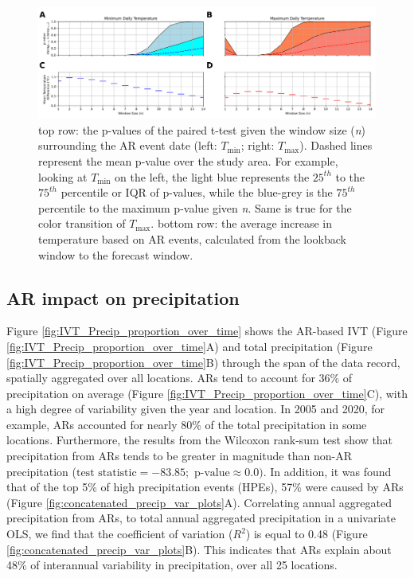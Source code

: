 \documentclass[12pts,draft]{AR_analysis_}
\begin{document}
\begin{figure}
\centering
\includegraphics[width=1.0\textwidth]{./images/tmin_vs_tmax_subplots.png}
\caption{top row: the p-values of the paired t-test given the
	window size (\emph{n}) surrounding the AR event date (left:
	$T_{\text{min}}$; right: $T_{\text{max}}$). Dashed lines
	represent the mean p-value over the study area. For example, looking 
	at $T_{\text{min}}$ on the left, the light blue represents the $25^{th}$ to the 
	$75^{th}$ percentile or IQR of p-values, while the blue-grey is the $75^{th}$ 
	percentile to the maximum p-value given \emph{n}. Same is true for the 
	color transition of $T_{\text{max}}$. bottom row: the average increase
	in temperature based on AR events, calculated from the lookback 
	window to the forecast window.}
\label{fig:tmin_vs_tmax_subplots} 
\end{figure}

\subsection{AR impact on precipitation}

Figure \ref{fig:IVT_Precip_proportion_over_time} shows the AR-based IVT 
(Figure \ref{fig:IVT_Precip_proportion_over_time}A) and total precipitation 
(Figure \ref{fig:IVT_Precip_proportion_over_time}B) through the span of the 
data record,
spatially aggregated over all locations. ARs tend to account for 36\% of
precipitation on average (Figure \ref{fig:IVT_Precip_proportion_over_time}C), 
with a high degree of variability given
the year and location. In 2005 and 2020, for example, ARs accounted for nearly 
80\% of the total precipitation in some locations. Furthermore, the results 
from the Wilcoxon rank-sum test show that
precipitation from ARs tends to be greater in magnitude than non-AR 
precipitation
($\text{test statistic} = -83.85; \text{ p-value} \approx 0.0)$. In addition, it
was found that of the top 5\% of high precipitation events (HPEs), 57\% were
caused by ARs (Figure \ref{fig:concatenated_precip_var_plots}A).
Correlating annual aggregated precipitation from ARs, to total annual
aggregated precipitation in a univariate OLS, we find that the
coefficient of variation ($R^{2}$) is equal to 0.48 (Figure 
\ref{fig:concatenated_precip_var_plots}B). This indicates that ARs
explain about 48\% of interannual variability in precipitation, 
over all 25 locations.  
\end{document}
